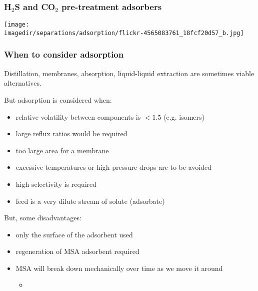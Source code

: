 \begin{frame}\frametitle{H$_2$S and CO$_2$ pre-treatment adsorbers}
	\begin{center}
		\texttt{[image: \\imagedir/separations/adsorption/flickr-4565083761\_18fcf20d57\_b.jpg]}
	\end{center}

\end{frame}

\begin{frame}\frametitle{When to consider adsorption}
	Distillation, membranes, absorption, liquid-liquid extraction are sometimes viable alternatives.

	\vspace{12pt}
	But adsorption is considered when:
	\begin{itemize}
		\item	relative volatility between components is $<1.5$ (e.g. isomers)
		\item	large reflux ratios would be required %
		\item	too large area for a membrane
		\item	excessive temperatures or high pressure drops are to be avoided
		\item	high selectivity is required
		\item	feed is a very dilute stream of solute ({\color{purple}adsorbate})
	\end{itemize}
	But, some disadvantages:
	\begin{itemize}
		\item	only the surface of the adsorbent used
		\item	regeneration of MSA adsorbent required
		\item	MSA will break down mechanically over time as we move it around
		\begin{itemize}
			\item	{\color{myOrange}{we must pump it, filter it, and/or put it through cyclones to process it}}
		\end{itemize}
	\end{itemize}
\end{frame}

